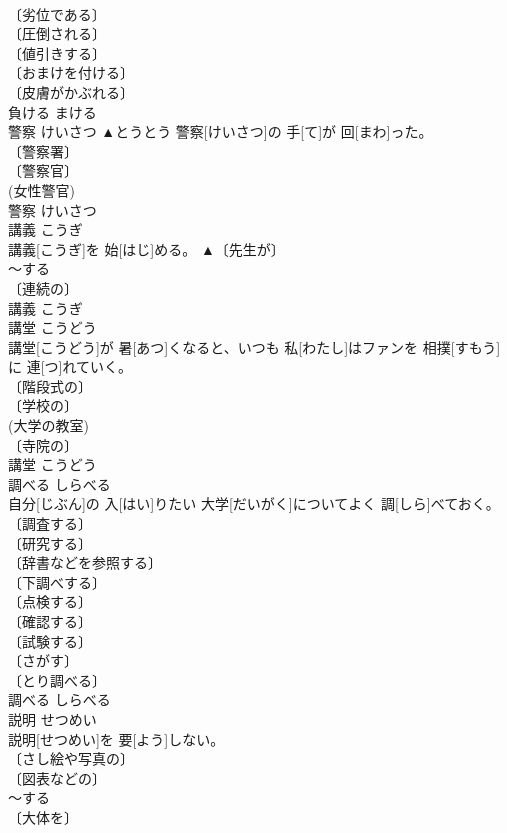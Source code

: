 \documentclass[8pt]{extreport}
\begin{document}
\begin{CJK}{UTF8}{min}
\\	〔劣位である〕 
\\	〔圧倒される〕 
\\	〔値引きする〕 
\\	〔おまけを付ける〕 
\\	〔皮膚がかぶれる〕 
\\	負ける	まける	
\\	警察	けいさつ	▲とうとう 警察[けいさつ]の 手[て]が 回[まわ]った。	
\\	〔警察署〕 
\\	〔警察官〕 
\\	(女性警官) 
\\	警察	けいさつ	
\\	講義	こうぎ	
\\	講義[こうぎ]を 始[はじ]める。	▲〔先生が〕 
\\	～する 
\\	〔連続の〕 
\\	講義	こうぎ	
\\	講堂	こうどう	
\\	講堂[こうどう]が 暑[あつ]くなると、いつも 私[わたし]はファンを 相撲[すもう]に 連[つ]れていく。	
\\	〔階段式の〕 
\\	〔学校の〕 
\\	(大学の教室) 
\\	〔寺院の〕 
\\	講堂	こうどう	
\\	調べる	しらべる	
\\	自分[じぶん]の 入[はい]りたい 大学[だいがく]についてよく 調[しら]べておく。	
\\	〔調査する〕 
\\	〔研究する〕 
\\	〔辞書などを参照する〕 
\\	〔下調べする〕 
\\	〔点検する〕 
\\	〔確認する〕 
\\	〔試験する〕 
\\	〔さがす〕 
\\	〔とり調べる〕 
\\	調べる	しらべる	
\\	説明	せつめい	
\\	説明[せつめい]を 要[よう]しない。	
\\	〔さし絵や写真の〕 
\\	〔図表などの〕 
\\	～する 
\\	〔大体を〕 

\end{CJK}
\end{document}
